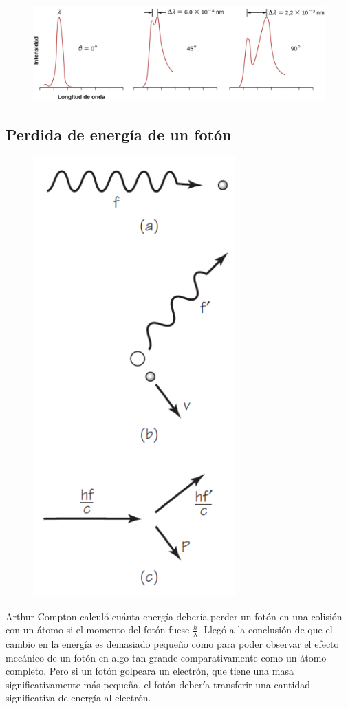 \documentclass[letterpaper, 12pt]{article}
\begin{document}
\begin{figure}[H]
      \begin{center}
            \includegraphics[width=.7\linewidth]{Images/Imagen_3.png}
            \caption{}
      \end{center}
\end{figure}

\subsection{Perdida de energía de un fotón~\cite{Tomé_2019}}

\begin{figure}
      \begin{center}
            \includegraphics[width=.3\textwidth]{Images/Imagen_4.png}
      \end{center}
\end{figure}

Arthur Compton calculó cuánta energía debería perder un
fotón en una colisión con un átomo si el momento del fotón
fuese $\frac{h}{\lambda}$. Llegó a la conclusión de que el
cambio en la energía es demasiado pequeño como para poder
observar el efecto mecánico de un fotón en algo tan grande
comparativamente como un átomo completo. Pero si un fotón
golpeara un electrón, que tiene una masa significativamente
más pequeña, el fotón debería transferir una cantidad
significativa de energía al electrón.
\end{document}

